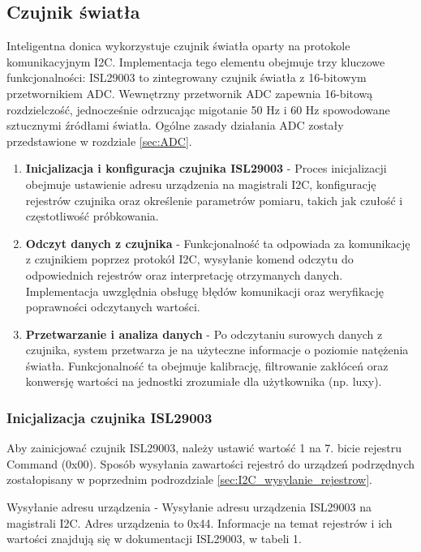 \subsection{Czujnik światła}
\label{sec:czujnik_swiatla}
Inteligentna donica wykorzystuje czujnik światła oparty na protokole komunikacyjnym I2C. Implementacja tego elementu obejmuje trzy kluczowe funkcjonalności:
ISL29003 to zintegrowany czujnik światła z 16-bitowym przetwornikiem ADC. Wewnętrzny przetwornik ADC zapewnia 16-bitową rozdzielczość, jednocześnie odrzucając migotanie 50 Hz i 60 Hz spowodowane sztucznymi źródłami światła. Ogólne zasady działania ADC zostały przedstawione w rozdziale \ref{sec:ADC}.

\begin{enumerate}
    \item \textbf{Inicjalizacja i konfiguracja czujnika ISL29003} - Proces inicjalizacji obejmuje ustawienie adresu urządzenia na magistrali I2C, konfigurację rejestrów czujnika oraz określenie parametrów pomiaru, takich jak czułość i częstotliwość próbkowania.

    \item \textbf{Odczyt danych z czujnika} - Funkcjonalność ta odpowiada za komunikację z czujnikiem poprzez protokół I2C, wysyłanie komend odczytu do odpowiednich rejestrów oraz interpretację otrzymanych danych. Implementacja uwzględnia obsługę błędów komunikacji oraz weryfikację poprawności odczytanych wartości.

    \item \textbf{Przetwarzanie i analiza danych} - Po odczytaniu surowych danych z czujnika, system przetwarza je na użyteczne informacje o poziomie natężenia światła. Funkcjonalność ta obejmuje kalibrację, filtrowanie zakłóceń oraz konwersję wartości na jednostki zrozumiałe dla użytkownika (np. luxy).
\end{enumerate}

\subsubsection{Inicjalizacja czujnika ISL29003}
    Aby zainicjować czujnik ISL29003, należy ustawić wartość 1 na 7. bicie rejestru Command (0x00). Sposób wysyłania zawartości rejestró do urządzeń podrzędnych zostałopisany w poprzednim podrozdziale \ref{sec:I2C_wysylanie_rejestrow}.

    Wysyłanie adresu urządzenia - Wysyłanie adresu urządzenia ISL29003 na magistrali I2C. Adres urządzenia to 0x44.
    Informacje na temat rejestrów i ich wartości znajdują się w dokumentacji ISL29003, w tabeli 1.\\%

